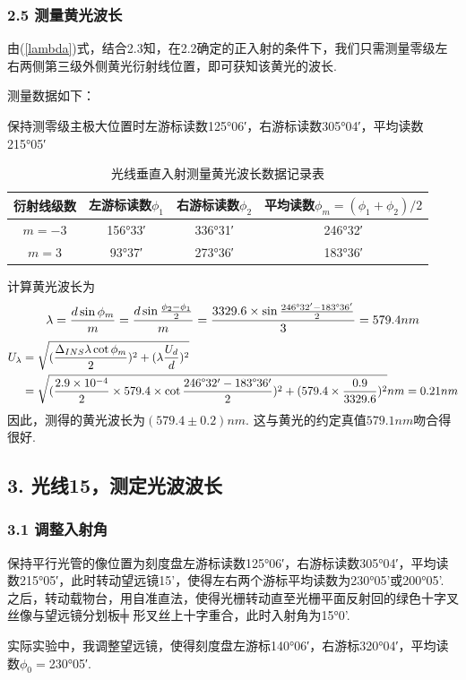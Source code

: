 \documentclass[UTF8]{ctexart}
\begin{document}
\subsubsection*{2.5 测量黄光波长}
由(\ref{lambda})式，结合2.3知，在2.2确定的正入射的条件下，我们只需测量零级左右两侧第三级外侧黄光衍射线位置，即可获知该黄光的波长.\par
测量数据如下：
\\\par
\begin{center}
保持测零级主极大位置时左游标读数125°06′，右游标读数305°04′，平均读数215°05′\vspace{-1em}
\end{center}
\begin{table}[H]\begin{center}
    \caption{光线垂直入射测量黄光波长数据记录表}
    \begin{tabular}{|c|c|c|c|}
        \hline
        衍射线级数&左游标读数$\phi_1$&右游标读数$\phi_2$&平均读数$\phi_m=(\phi_1+\phi_2)/2$\\
        \hline
        $m=-3$&	156°33′&336°31′&246°32′\\
        \hline
        $m=3$&	93°37′&273°36′&183°36′\\
        \hline        
    \end{tabular}
\end{center}\end{table}
计算黄光波长为\\
\[\lambda=\frac{d\sin\phi_m}{m}=\frac{d\sin\frac{\phi_{2}-\phi_{1}}{2}}{m}=\frac{3329.6\times\sin\frac{246\degree32'-183\degree36'}{2}}{3}=579.4nm\]
\begin{equation}\nonumber\begin{split}
U_{\lambda}&=\sqrt{(\frac{\Delta_{INS}\lambda \cot\phi_m}{2})^2+(\lambda\frac{U_d}{d})^2}\\&=\sqrt{(\frac{2.9\times10^{-4}}{2}\times579.4\times\cot\frac{246\degree32'-183\degree36'}{2})^2+(579.4\times\frac{0.9}{3329.6})^2}nm=0.21nm
\end{split}\end{equation}
因此，测得的黄光波长为$(579.4\pm0.2)nm$. 这与黄光的约定真值$579.1nm$吻合得很好.

\subsection*{ 3. 光线15，测定光波波长}

\subsubsection*{3.1 调整入射角}
保持平行光管的像位置为刻度盘左游标读数125°06′，右游标读数305°04′，平均读数215°05′，此时转动望远镜15'，使得左右两个游标平均读数为230°05'或200°05'. 之后，转动载物台，用自准直法，使得光栅转动直至光栅平面反射回的绿色十字叉丝像与望远镜分划板╪ 形叉丝上十字重合，此时入射角为15°0'.\par
实际实验中，我调整望远镜，使得刻度盘左游标140°06′，右游标320°04′，平均读数$\phi_0=$230°05′.
\end{document}
